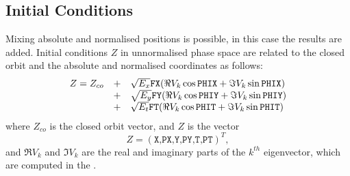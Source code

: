 \subsection{Initial Conditions}
Mixing absolute and normalised positions is possible,
in this case the results are added.
Initial conditions $Z$ in unnormalised phase space are related 
to the closed orbit and the absolute and normalised coordinates as follows:
\[
\begin{array}{rcl}
  Z = Z_{co}&+& \sqrt{E_x} \hbox{\tt FX}
  (\Re V_k \cos \hbox{\tt PHIX} + \Im V_k \sin \hbox{\tt PHIX}) \\
  &+& \sqrt{E_y} \hbox{\tt FY}
  (\Re V_k \cos \hbox{\tt PHIY} + \Im V_k \sin \hbox{\tt PHIY}) \\
  &+& \sqrt{E_t} \hbox{\tt FT}
  (\Re V_k \cos \hbox{\tt PHIT} + \Im V_k \sin \hbox{\tt PHIT})
\end{array}
\]
where $Z_{co}$ is the closed orbit vector, and $Z$ is the vector 
\[
Z = (\texttt{X,PX,Y,PY,T,PT})^T,
\]
and $\Re V_k$ and $\Im V_k$ are the real and imaginary parts of the 
$k^{th}$ eigenvector,
which are computed in the .

